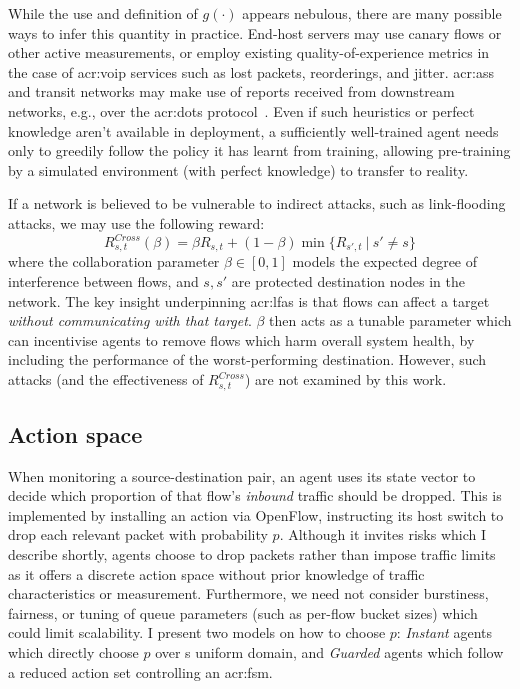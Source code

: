 While the use and definition of $g(\cdot)$ appears nebulous, there are many possible ways to infer this quantity in practice.
End-host servers may use canary flows or other active measurements, or employ existing quality-of-experience metrics in the case of \gls{acr:voip} services such as lost packets, reorderings, and jitter.
\glspl{acr:as} and transit networks may make use of reports received from downstream networks, e.g., over the \gls{acr:dots} protocol~\parencite{ietf-dots-use-cases-17}.
Even if such heuristics or perfect knowledge aren't available in deployment, a sufficiently well-trained agent needs only to greedily follow the policy it has learnt from training, allowing pre-training by a simulated environment (with perfect knowledge) to transfer to reality.

If a network is believed to be vulnerable to indirect attacks, such as link-flooding attacks, we may use the following reward:
\begin{equation}
	R_{s,t}^{\mathit{Cross}}(\beta) = \beta R_{s,t} + (1 - \beta) \min{\{R_{s',t}~|~s' \ne s\}} \label{eqn:lfa-reward}
\end{equation}
where the collaboration parameter $\beta \in [0,1]$ models the expected degree of interference between flows, and $s, s'$ are protected destination nodes in the network.
The key insight underpinning \glspl{acr:lfa} is that flows can affect a target \emph{without communicating with that target}.
$\beta$ then acts as a tunable parameter which can incentivise agents to remove flows which harm overall system health, by including the performance of the worst-performing destination.
However, such attacks (and the effectiveness of $R_{s,t}^{\mathit{Cross}}$) are not examined by this work.

\subsection{Action space}\label{sec:ddos-action-space-risks}
When monitoring a source-destination pair, an agent uses its state vector to decide which proportion of that flow's \emph{inbound} traffic should be dropped.
This is implemented by installing an action via OpenFlow, instructing its host switch to drop each relevant packet with probability $p$.
Although it invites risks which I describe shortly, agents choose to drop packets rather than impose traffic limits as it offers a discrete action space without prior knowledge of traffic characteristics or measurement.
Furthermore, we need not consider burstiness, fairness, or tuning of queue parameters (such as per-flow bucket sizes) which could limit scalability.
I present two models on how to choose $p$: \emph{Instant} agents which directly choose $p$ over s uniform domain, and \emph{Guarded} agents which follow a reduced action set controlling an \gls{acr:fsm}.

